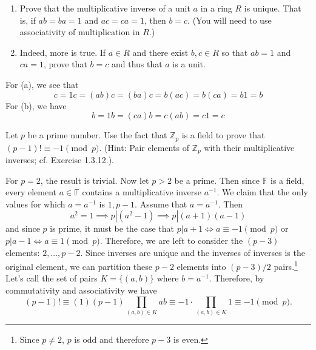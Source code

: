   \begin{exercise}[Shifrin 1.4.10]
    \begin{enumerate}
      \item Prove that the multiplicative inverse of a unit $a$ in a ring $R$ is unique. That is, if $ab = ba = 1$ and $ac = ca = 1$, then $b = c$. (You will need to use associativity of multiplication in $R$.)
      
      \item Indeed, more is true. If $a \in R$ and there exist $b,c \in R$ so that $ab = 1$ and $ca = 1$, prove that $b = c$ and thus that $a$ is a unit.
    \end{enumerate}
  \end{exercise}
  \begin{solution}
    For (a), we see that 
    \begin{equation}
      c = 1c = (ab)c = (ba)c = b(ac) = b(ca) = b1 = b
    \end{equation} 
    For (b), we have  
    \begin{equation}
      b = 1b = (ca)b = c(ab) = c1 = c
    \end{equation}
  \end{solution}

  \begin{exercise}[Shifrin 1.4.13]
    Let $p$ be a prime number. Use the fact that $\mathbb{Z}_p$ is a field to prove that $(p-1)! \equiv -1 \pmod{p}$. (Hint: Pair elements of $\mathbb{Z}_p$ with their multiplicative inverses; cf. Exercise 1.3.12.). 
  \end{exercise}
  \begin{solution}
    For $p = 2$, the result is trivial. Now let $p > 2$ be a prime. Then since $\mathbb{F}$ is a field, every element $a \in \mathbb{F}$ contains a multiplicative inverse $a^{-1}$. We claim that the only values for which $a = a^{-1}$ is $1, p-1$. Assume that $a = a^{-1}$. Then 
    \begin{equation}
      a^2 = 1 \implies p|(a^2 - 1) \implies p | (a+1)(a-1)
    \end{equation}
    and since $p$ is prime, it must be the case that $p|a+1 \iff a \equiv -1 \pmod{p}$ or $p|a-1 \iff a \equiv 1 \pmod{p}$. Therefore, we are left to consider the $(p-3)$ elements: $2, \ldots, p-2$. Since inverses are unique and the inverses of inverses is the original element, we can partition these $p-2$ elements into $(p-3)/2$ pairs.\footnote{Since $p \neq 2$, $p$ is odd and therefore $p-3$ is even.} Let's call the set of pairs $K = \{(a, b)\}$ where $b = a^{-1}$. Therefore, by commutativity and associativity we have 
    \begin{equation}
      (p-1)! \equiv (1)(p-1) \prod_{(a, b) \in K} ab \equiv -1 \cdot \prod_{(a, b) \in K} 1 \equiv -1 \pmod{p}. 
    \end{equation}
  \end{solution} 

